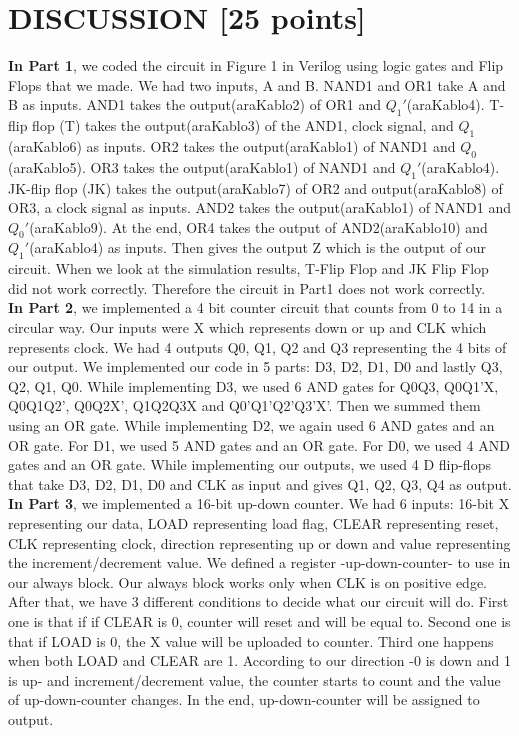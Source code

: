 \documentclass[pdftex,12pt,a4paper]{article}
\begin{document}
\clearpage



\section{DISCUSSION [25 points]}
\textbf{In Part 1}, we coded the circuit in Figure 1 in Verilog using logic gates and Flip Flops that we made. We had two inputs,  A and B. NAND1 and OR1 take A and B as inputs. AND1 takes the output(araKablo2) of OR1 and \(Q_1'\)(araKablo4). T-flip flop (T) takes the output(araKablo3) of the AND1, clock signal, and \(Q_1\)(araKablo6) as inputs. OR2 takes the output(araKablo1) of NAND1 and \(Q_0\)(araKablo5). OR3 takes the output(araKablo1) of NAND1 and \(Q_1'\)(araKablo4).  JK-flip flop (JK) takes the output(araKablo7) of OR2 and output(araKablo8) of OR3, a clock signal as inputs. AND2 takes the output(araKablo1) of NAND1 and \(Q_0'\)(araKablo9). At the end, OR4 takes the output of AND2(araKablo10) and \(Q_1'\)(araKablo4) as inputs. Then gives the output Z which is the output of our circuit. When we look at the simulation results, T-Flip Flop and JK Flip Flop did not work correctly. Therefore the circuit in Part1 does not work correctly.\\

\textbf{In Part 2}, we implemented a 4 bit counter circuit that counts from 0 to 14 in a circular way. Our inputs were X which represents down or up and CLK which represents clock. We had 4 outputs Q0, Q1, Q2 and Q3 representing the 4 bits of our output. We implemented our code in 5 parts: D3, D2, D1, D0 and lastly Q3, Q2, Q1, Q0. While implementing D3, we used 6 AND gates for Q0Q3, Q0Q1'X, Q0Q1Q2', Q0Q2X', Q1Q2Q3X and Q0'Q1'Q2'Q3'X'. Then we summed them using an OR gate. While implementing D2, we again used 6 AND gates and an OR gate. For D1, we used 5 AND gates and an OR gate. For D0, we used 4 AND gates and an OR gate. While implementing our outputs, we used 4 D flip-flops that take D3, D2, D1, D0 and CLK as input and gives Q1, Q2, Q3, Q4 as output.\\

\textbf{In Part 3}, we implemented a 16-bit up-down counter. We had 6 inputs: 16-bit X representing our data, LOAD representing load flag, CLEAR representing reset, CLK representing clock, direction representing up or down and value representing the increment/decrement value. We defined a register -up-down-counter- to use in our always block. Our always block works only when CLK is on positive edge. After that, we have 3 different conditions to decide what our circuit will do. First one is that if if CLEAR is 0, counter will reset and will be equal to. Second one is that if LOAD is 0, the X value will be uploaded to counter. Third one happens when both LOAD and CLEAR are 1. According to our direction -0 is down and 1 is up- and increment/decrement value, the counter starts to count and the value of up-down-counter changes. In the end, up-down-counter will be assigned to output.\\
\end{document}
